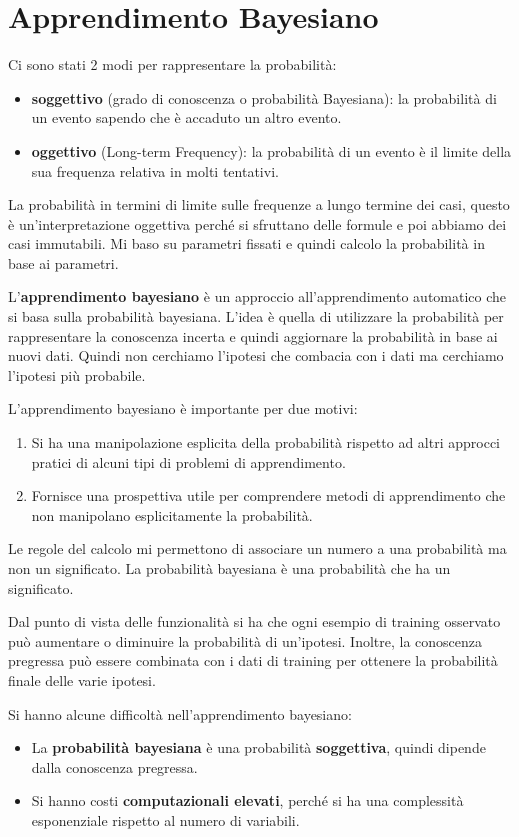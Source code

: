 \chapter{Apprendimento Bayesiano}
Ci sono stati 2 modi per rappresentare la probabilità:
\begin{itemize}
    \item \textbf{soggettivo} (grado di conoscenza o probabilità Bayesiana): la probabilità
          di un evento sapendo che è accaduto un altro evento.
    \item \textbf{oggettivo} (Long-term Frequency): la probabilità di un evento è il limite
          della sua frequenza relativa in molti tentativi.
\end{itemize}
La probabilità in termini di limite sulle frequenze a lungo termine dei casi,
questo è un'interpretazione oggettiva perché si sfruttano delle formule e poi
abbiamo dei casi immutabili. Mi baso su parametri fissati e quindi calcolo la
probabilità in base ai parametri.

L'\textbf{apprendimento bayesiano} è un approccio all'apprendimento automatico che si basa
sulla probabilità bayesiana. L'idea è quella di utilizzare la probabilità per
rappresentare la conoscenza incerta e quindi aggiornare la probabilità in base
ai nuovi dati. Quindi non cerchiamo l'ipotesi che combacia con i dati ma cerchiamo
l'ipotesi più probabile.

L'apprendimento bayesiano è importante per due motivi:
\begin{enumerate}
    \item Si ha una manipolazione esplicita della probabilità rispetto ad altri
          approcci pratici di alcuni tipi di problemi di apprendimento.
    \item Fornisce una prospettiva utile per comprendere metodi di apprendimento
          che non manipolano esplicitamente la probabilità.
\end{enumerate}

Le regole del calcolo mi permettono di associare un numero a una probabilità ma
non un significato. La probabilità bayesiana è una probabilità che ha un significato.

Dal punto di vista delle funzionalità si ha che ogni esempio di training osservato
può aumentare o diminuire la probabilità di un'ipotesi. Inoltre, la conoscenza
pregressa può essere combinata con i dati di training per ottenere la probabilità
finale delle varie ipotesi.

Si hanno alcune difficoltà nell'apprendimento bayesiano:
\begin{itemize}
    \item La \textbf{probabilità bayesiana} è una probabilità \textbf{soggettiva}, quindi dipende
          dalla conoscenza pregressa.
    \item Si hanno costi \textbf{computazionali elevati}, perché si ha una complessità
          esponenziale rispetto al numero di variabili.
\end{itemize}

